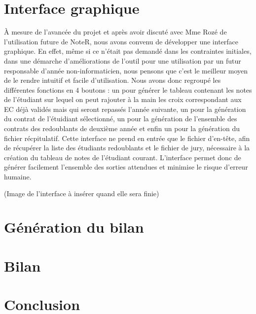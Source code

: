 \documentclass[a4paper,11pt]{article}
\begin{document}
\section{Interface graphique }	

    À mesure de l'avancée du projet et après avoir discuté avec Mme Rozé de l'utilisation future de NoteR, nous avons convenu de développer une interface graphique. En effet, même si ce n'était pas demandé dans les contraintes initiales,  dans une démarche d'améliorations de l'outil pour une utilisation par un futur responsable d'année non-informaticien, nous pensons que c'est le meilleur moyen de le rendre intuitif et facile d'utilisation. Nous avons donc regroupé les différentes fonctions en 4 boutons : un  pour générer le tableau contenant les notes de l'étudiant sur lequel on peut rajouter à la main les croix correspondant aux EC déjà validés mais qui seront repassés l'année suivante, un pour la génération du contrat de l'étuidiant sélectionné, un pour la génération de l'ensemble des contrats des redoublants de deuxième année et enfin un pour la génération du fichier récpitulatif. Cette interface ne prend en entrée que le fichier d'en-tête, afin de récupérer la liste des étudiants redoublants et le fichier de jury, nécessaire à la création du tableau de notes de l'étudiant courant. L'interface permet donc de générer facilement l'ensemble des sorties attendues et minimise le risque d'erreur humaine.

    (Image de l'interface à insérer quand elle sera finie)

\section{Génération du bilan }
 

\section{Bilan }
  

\section*{Conclusion}
  


\end{document}
